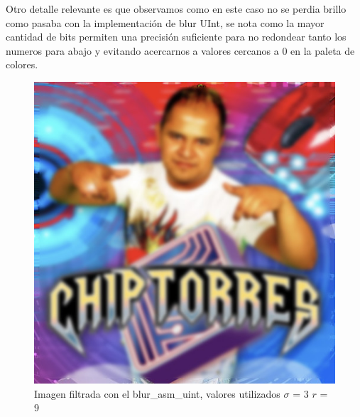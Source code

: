 Otro detalle relevante es que observamos como en este caso no se perdia brillo
como pasaba con la implementación de blur UInt, se nota como la mayor cantidad
de bits permiten una precisión suficiente para no redondear tanto los numeros
para abajo y evitando acercarnos a valores cercanos a 0 en la paleta de colores.

\begin{figure}[H]
\centering
    \includegraphics[scale=0.5]{imgs/chip_hd_uint.jpg}
  \caption{\footnotesize{Imagen filtrada con el blur\_asm\_uint, valores utilizados $\sigma$ = 3 $r$ = 9}}
  \label{fig:tiempo1}
\end{figure}
